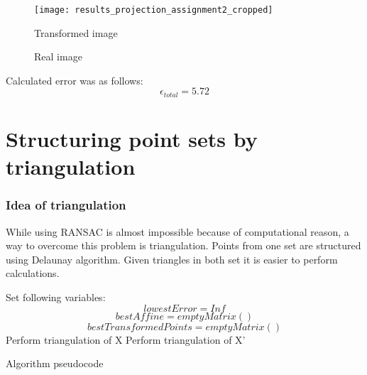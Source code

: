 \documentclass[notitlepage,english]{hgbreport}
\begin{document}
\begin{figure}[!htbp]
  \centering
  \begin{minipage}[b]{0.4\textwidth}

  \texttt{[image: results\_projection\_assignment2\_cropped]}
  \caption{Transformed image}
  \end{minipage}
  \hfill
  \begin{minipage}[b]{0.4\textwidth}
    \caption{Real image}
  \end{minipage}
\end{figure}



Calculated error was as follows:
\begin{equation}
\epsilon_{total}=5.72
\end{equation}





\section {Structuring point sets by triangulation}
\subsubsection{Idea of triangulation}
While using RANSAC is almost impossible because of computational reason, a way to overcome this problem is triangulation. Points from one set are structured using Delaunay algorithm. Given triangles in both set it is easier to perform calculations.


\begin{algorithm}[H]

 Set following variables:
\[lowestError=Inf\] 
 \[bestAffine=emptyMatrix()\] 
 \[bestTransformedPoints=emptyMatrix()\] 
Perform triangulation of X \newline
Perform triangulation of X' \newline

 \caption{Algorithm pseudocode}
\end{algorithm}
\end{document}

